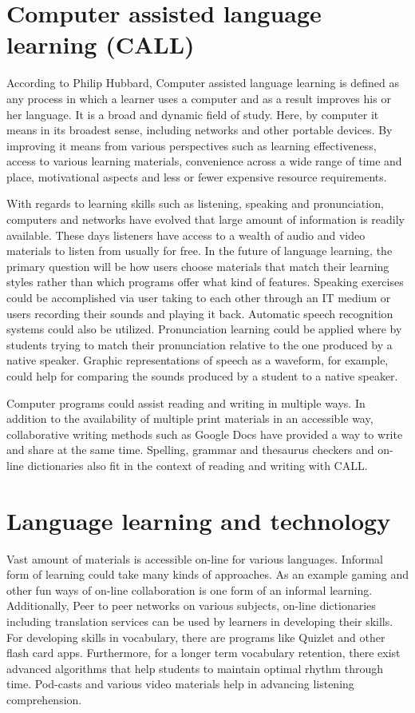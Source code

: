 \documentclass[11pt,a4paper,oneside,article]{memoir}
\begin{document}
\section{Computer assisted language learning (CALL)}
According to Philip Hubbard, Computer assisted language learning is defined as any process in which a learner uses a computer and as a result improves his or her language. It is a broad and dynamic field of study. Here, by computer it means in its broadest sense, including networks and other portable devices. By improving it means from various perspectives such as learning effectiveness, access to various learning materials, convenience across a wide range of time and place, motivational aspects and less or fewer expensive resource requirements.\cite{hubbard}

With regards to learning skills such as listening, speaking and pronunciation, computers and networks have evolved that large amount of information is readily available. These days listeners have access to a wealth of audio and video materials to listen from usually for free. In the future of language learning, the primary question will be how users choose materials that match their learning styles rather than which programs offer what kind of features. Speaking exercises could be accomplished via user taking to each other through an IT medium or users recording their sounds and playing it back. Automatic speech recognition systems could also be utilized. Pronunciation learning could be applied where by students trying to match their pronunciation relative to the one produced by a native speaker. Graphic representations of speech as a waveform, for example, could help for comparing the sounds produced by a student to a native speaker.\cite{hubbard}

Computer programs could assist reading and writing in multiple ways. In addition to the availability of multiple print materials in an accessible way, collaborative writing methods such as Google Docs have provided a way to write and share at the same time. Spelling, grammar and thesaurus checkers and on-line dictionaries also fit in the context of reading and writing with CALL.\cite{hubbard}

\section{Language learning and technology}
Vast amount of materials is accessible on-line for various languages. Informal form of learning could take many kinds of approaches. As an example gaming and other fun ways of on-line collaboration is one form of an informal learning. Additionally, Peer to peer networks on various subjects, on-line dictionaries including translation services can be used by learners in developing their skills. For developing skills in vocabulary, there are programs like Quizlet and other flash card apps. Furthermore, for a longer term vocabulary retention, there exist advanced algorithms that help students to maintain optimal rhythm through time. Pod-casts and various video materials help in advancing listening comprehension. 
\end{document}
